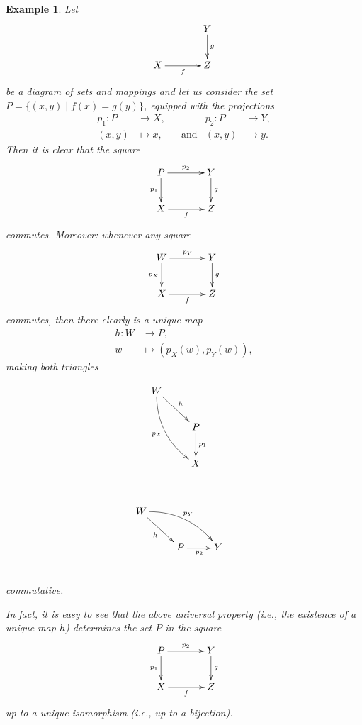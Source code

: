\documentclass[11pt,a4paper,twoside,openany]{report}
\theoremstyle{my-theorem}
\theoremstyle{non-theorem}
\newtheorem{example}[theorem]{Example}
\begin{document}
			\begin{example}
				Let
				\begin{align*}
					\xymatrixcolsep{3pc}\xymatrix{
					& Y \ar[d]^-{g}\\
					X \ar[r]_-{f} & Z
				}
				\end{align*}
				be a diagram of sets and mappings and let us consider the set $P = \{(x,y)\mid f(x) = g(y)\}$, equipped with the projections
				\begin{align*}
					p_1: P &\to X,
				&
					&
				&
					p_2: P &\to Y,
				\\
					(x,y) &\mapsto x,
				&
					&\text{and}
				&
					(x,y) &\mapsto y.
				\end{align*}
				Then it is clear that the square
				\begin{align*}
					\xymatrixcolsep{3pc}\xymatrix{
					P \ar[d]_-{p_1} \ar[r]^-{p_2} & Y \ar[d]^-g\\
					X \ar[r]_-f & Z
				}
				\end{align*}
				commutes. Moreover: whenever \emph{any} square
				\begin{align*}
					\xymatrixcolsep{3pc}\xymatrix{
						W \ar[d]_-{p_X} \ar[r]^-{p_Y} & Y \ar[d]^-g\\
						X \ar[r]_-f & Z
					}
				\end{align*}
				commutes, then there clearly is a \emph{unique} map
				\begin{align*}
					h: W &\to P,
				\\
					w &\mapsto (p_X(w),p_Y(w)),
				\end{align*}
				making both triangles\\
				\begin{minipage}{0.45\textwidth}
					\begin{align*}
						&\xymatrix{
							W \ar@/_1pc/[rdd]_-{p_X} \ar[rd]^-h &\\
							& P \ar[d]^-{p_1}\\
							& X
						}
					\end{align*}
				\end{minipage}
				~
				\begin{minipage}{0.45\textwidth}
					\begin{align*}
						&\xymatrix{
							W \ar[rd]_-h \ar@/^1pc/[rrd]^-{p_Y} & &\\
							& P \ar[r]_-{p_2} & Y 
						}
					\end{align*}
				\end{minipage}\\
				commutative.
				
				In fact, it is easy to see that the above \emph{universal property} (i.e., the existence of a unique map $h$) determines the set $P$ in the square
				\begin{align*}
					\xymatrixcolsep{3pc}\xymatrix{
						P \ar[d]_-{p_1} \ar[r]^-{p_2} & Y \ar[d]^-g\\
						X \ar[r]_-f & Z
					}
				\end{align*}
				up to a unique isomorphism (i.e., up to a bijection).
			\end{example}
			
\end{document}
